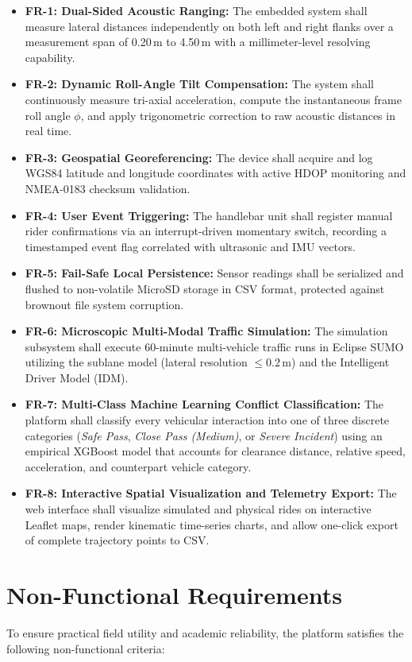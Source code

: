 \begin{itemize}
    \item \textbf{FR-1: Dual-Sided Acoustic Ranging:} The embedded system shall measure lateral distances independently on both left and right flanks over a measurement span of 0.20\,m to 4.50\,m with a millimeter-level resolving capability.
    \item \textbf{FR-2: Dynamic Roll-Angle Tilt Compensation:} The system shall continuously measure tri-axial acceleration, compute the instantaneous frame roll angle $\phi$, and apply trigonometric correction to raw acoustic distances in real time.
    \item \textbf{FR-3: Geospatial Georeferencing:} The device shall acquire and log WGS84 latitude and longitude coordinates with active HDOP monitoring and NMEA-0183 checksum validation.
    \item \textbf{FR-4: User Event Triggering:} The handlebar unit shall register manual rider confirmations via an interrupt-driven momentary switch, recording a timestamped event flag correlated with ultrasonic and IMU vectors.
    \item \textbf{FR-5: Fail-Safe Local Persistence:} Sensor readings shall be serialized and flushed to non-volatile MicroSD storage in CSV format, protected against brownout file system corruption.
    \item \textbf{FR-6: Microscopic Multi-Modal Traffic Simulation:} The simulation subsystem shall execute 60-minute multi-vehicle traffic runs in Eclipse SUMO utilizing the sublane model (lateral resolution $\le 0.2\,\text{m}$) and the Intelligent Driver Model (IDM).
    \item \textbf{FR-7: Multi-Class Machine Learning Conflict Classification:} The platform shall classify every vehicular interaction into one of three discrete categories (\textit{Safe Pass}, \textit{Close Pass (Medium)}, or \textit{Severe Incident}) using an empirical XGBoost model that accounts for clearance distance, relative speed, acceleration, and counterpart vehicle category.
    \item \textbf{FR-8: Interactive Spatial Visualization and Telemetry Export:} The web interface shall visualize simulated and physical rides on interactive Leaflet maps, render kinematic time-series charts, and allow one-click export of complete trajectory points to CSV.
\end{itemize}

\section{Non-Functional Requirements}
To ensure practical field utility and academic reliability, the platform satisfies the following non-functional criteria:

